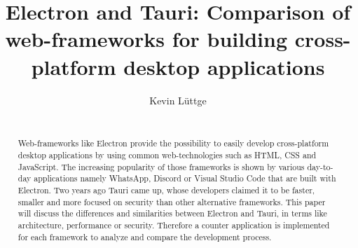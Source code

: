 \documentclass{acm_proc_article-sp}
\date{\displaydate{date}}
\begin{document}
    \title{{\ttlit Electron} and {\ttlit Tauri}: Comparison of web-frameworks for building cross-platform desktop applications}
    \author{
        \alignauthor
        Kevin L\"uttge \\
        \\
    }

    \maketitle

    \begin{abstract}
        Web-frameworks like Electron provide the possibility to easily develop cross-platform desktop applications by using common web-technologies
        such as \ac{HTML}, \ac{CSS} and JavaScript.
        The increasing popularity of those frameworks is shown by various day-to-day applications namely WhatsApp, Discord or Visual Studio Code
        that are built with Electron.
        Two years ago Tauri came up, whose developers claimed it to be faster, smaller and more focused on security than other alternative frameworks.
        This paper will discuss the differences and similarities between Electron and Tauri, in terms like architecture, performance or security.
        Therefore a counter application is implemented for each framework to analyze and compare the development process.
    \end{abstract}

    
    
    
    \newpage

    
    

    \balancecolumns
\end{document}
